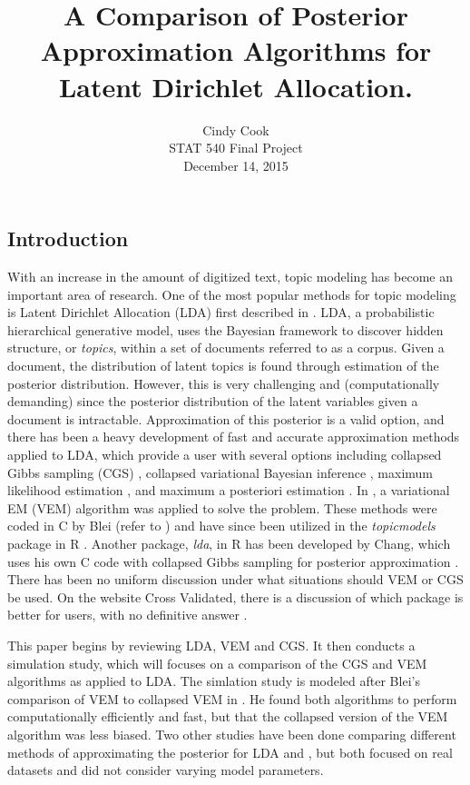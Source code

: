 \documentclass[12pt]{report}
\begin{document}
	\title{A Comparison of Posterior Approximation Algorithms for Latent Dirichlet Allocation.}
	\author{Cindy Cook \\ \normalsize STAT 540 Final Project \\ \normalsize December 14, 2015}
	\date{}
	\maketitle
	
	\vspace{-10mm}
\begin{flushleft}
\section{Introduction}
With an increase in the amount of digitized text, topic modeling has become an important area of research. One of the most popular methods for topic modeling is Latent Dirichlet Allocation (LDA) first described in \cite{lda}. LDA, a probabilistic hierarchical generative model, uses the Bayesian framework to discover hidden structure, or \textit{topics},  within a set of documents referred to as a corpus. Given a document, the distribution of latent topics is found through estimation of the posterior distribution. However, this is very challenging and (computationally demanding) since the posterior distribution of the latent variables given a document is intractable. Approximation of this posterior is a valid option, and there has been a heavy development of fast and accurate approximation methods applied to LDA, which provide a user with several options including collapsed Gibbs sampling (CGS) \cite{CGS}, collapsed variational Bayesian inference \cite{CVB}, maximum likelihood estimation \cite{ML}, and maximum a posteriori estimation \cite{MAP}. In \cite{lda}, a variational EM (VEM) algorithm was applied to solve the problem. These methods were coded in C by Blei (refer to \cite{Ccode}) and have since been utilized in the \textit{topicmodels} package in R \cite{topicsR}. Another package, \textit{lda}, in R has been developed by Chang, which uses his own C code with collapsed Gibbs sampling for posterior approximation \cite{ldaR}. There has been no uniform discussion under what situations should VEM or CGS be used. On the website Cross Validated, there is a discussion of which package is better for users, with no definitive answer \cite{STACK}.
\par
This paper begins by reviewing LDA, VEM and CGS. It then conducts a simulation study, which will focuses on a comparison of the CGS and VEM algorithms as applied to LDA. The simlation study is modeled after Blei's comparison of VEM to collapsed VEM in \cite{BleiComp}. He found both algorithms to perform computationally efficiently and fast, but that the collapsed version of the VEM algorithm was less biased. Two other studies have been done comparing different methods of approximating the posterior for LDA \cite{Comp} and \cite{CVB}, but both focused on real datasets and did not consider varying model parameters. 


\end{flushleft}
\end{document}
